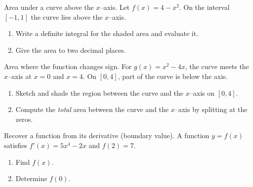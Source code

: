 \documentclass[11pt]{article}
\def\textbf#1{#1}%
\newcounter{question}
\begin{document}
\begin{question}
\textbf{Area under a curve above the $x$–axis.}
Let $f(x)=4-x^{2}$. On the interval $[-1,1]$ the curve lies above the $x$–axis.
\begin{enumerate}
  \item Write a definite integral for the shaded area and evaluate it.
  \item Give the area to two decimal places.

\begin{center}
\end{center}
\end{enumerate}
\end{question}

\begin{question}
\textbf{Area where the function changes sign.}
For $g(x)=x^{2}-4x$, the curve meets the $x$–axis at $x=0$ and $x=4$. On $[0,4]$, part of the curve is below the axis.
\begin{enumerate}
  \item Sketch and shade the region between the curve and the $x$–axis on $[0,4]$.
  \item Compute the \emph{total} area between the curve and the $x$–axis by splitting at the zeros.
\end{enumerate}
\end{question}

\begin{question}
\textbf{Recover a function from its derivative (boundary value).}
A function $y=f(x)$ satisfies $f'(x)=5x^{4}-2x$ and $f(2)=7$.
\begin{enumerate}
  \item Find $f(x)$.
  \item Determine $f(0)$.
\end{enumerate}
\end{question}
\end{document}
